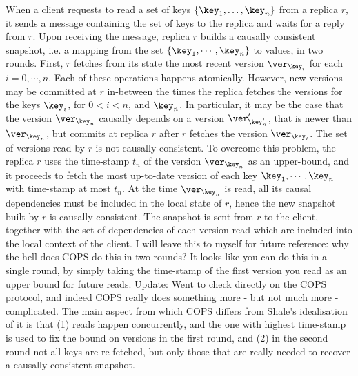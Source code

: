 When a client requests to read a set of keys \( \{\key_1, \dots,
\key_n\} \) from a  replica $r$, it sends a message 
containing the set of keys to the replica and  waits for a reply from $r$. Upon receiving the message, replica $r$ builds a causally consistent snapshot, i.e. 
a mapping from the set $\{\key_{1},\cdots, \key_{n}\}$ to values, in two rounds. 
First, $r$ fetches from its state 
the most recent version \( \ver_{\key_i} \) for each $i
=0,\cdots,n$. Each of these operations happens atomically. However, 
new versions may be committed at $r$ in-between the times the replica fetches the versions for the keys 
$\key_{i}$, for $0 < i < n$,  and $\key_{n}$. In particular, it may be the case that the version $\ver_{\key_{n}}$ causally depends 
on a version $\ver'_{\key'_{n}}$, that is newer than $\ver_{\key_{n}}$,  but commits at replica $r$ 
after $r$ fetches the version $\ver_{\key_{i}}$. The set of versions read by $r$ is not causally consistent. 
To overcome this problem, the replica $r$ uses the time-stamp $t_{n}$ of the version $\ver_{\key_{n}}$ as an upper-bound, 
and it proceeds to fetch the most up-to-date version of each key $\key_{1}, \cdots, \key_{n}$ with time-stamp 
at most $t_{n}$. At the time $\ver_{\key_{n}}$ is read,  all its causal dependencies must be included in the local 
state of $r$, hence the new snapshot built by $r$ is causally consistent. The snapshot is sent  from $r$ 
to the client, together with the set of dependencies of each version
read which are 
included into the local context of the client.
\ac{I will leave this to myself for future reference: why the hell does COPS do this in two rounds? It looks like you can do 
this in a single round, by simply taking the time-stamp of the first version you read as an upper bound for future reads.
Update: Went to check directly on the COPS protocol, and indeed COPS really does something more - but not much more - complicated. 
The main aspect from which COPS differs from Shale's idealisation of it is that (1) reads happen concurrently, and the 
one with highest time-stamp is used to fix the bound on versions in the first round, and (2) in the second round not all keys 
are re-fetched, but only those that are really needed to recover a causally consistent snapshot.}

